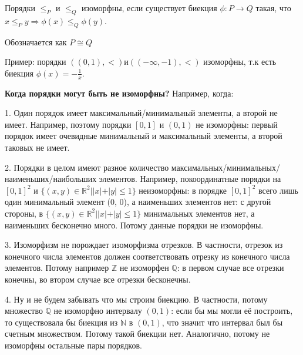Порядки $\le_P$ и $\le_Q$ изоморфны, если существует биекция $\phi: P \rightarrow Q$ такая, что $x \le_P y \Rightarrow \phi(x) \le_Q \phi(y)$.

Обозначается как $P \cong Q$

Пример: порядки $((0, 1), <) и ((-\infty, -1), <)$ изоморфны, т.к есть биекция $\phi(x) = -\frac{1}{x}$.

\textbf{Когда порядки могут быть не изоморфны?} Например, когда:

\hspace{0.5cm}\parbox{15cm} {
    1. Один порядок имеет максимальный/минимальный элементы, а второй не имеет. Например, поэтому порядки $[0, 1]$ и $(0, 1)$ не изоморфны: первый порядок имеет очевидные минимальный и максимальный элементы, а второй таковых не имеет.

    2. Порядки в целом имеют разное количество максимальных/минимальных/наименьших/наибольших элементов. Например, покоординатные порядки на $[0, 1]^2$ и $\{(x, y) \in \mathbb{R}^2 | |x| + |y| \le 1\}$ неизоморфны: в порядке $[0, 1]^2$ всего лишь один минимальный элемент (0, 0), а наименьших элементов нет: с другой стороны, в $\{(x, y) \in \mathbb{R}^2 | |x| + |y| \le 1\}$ минимальных элементов нет, а наименьших бесконечно много. Потому данные порядки не изоморфны.

    3. Изоморфизм не порождает изоморфизма отрезков. В частности, отрезок из конечного числа элементов должен соответствовать отрезку из конечного числа элементов. Потому например $\mathbb{Z}$ не изоморфен $\mathbb{Q}$: в первом случае все отрезки конечны, во втором случае все отрезки бесконечны.

    4. Ну и не будем забывать что мы строим биекцию. В частности, потому множество $\mathbb{Q}$ не изоморфно интервалу $(0, 1)$: если бы мы могли её построить, то существовала бы биекция из $\mathbb{N}$ в $(0, 1)$, что значит что интервал был бы счетным множеством. Потому такой биекции нет. Аналогично, потому не изоморфны остальные пары порядков.

 }
